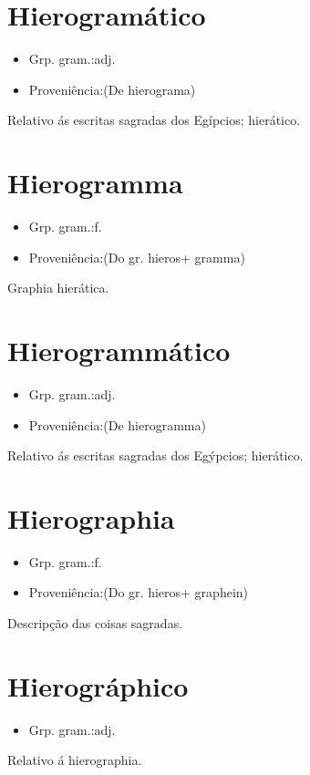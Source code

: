 \documentclass{article}
\begin{document}
\section{Hierogramático}
\begin{itemize}
\item {Grp. gram.:adj.}
\end{itemize}
\begin{itemize}
\item {Proveniência:(De \textunderscore hierograma\textunderscore )}
\end{itemize}
Relativo ás escritas sagradas dos Egípcios; hierático.
\section{Hierogramma}
\begin{itemize}
\item {Grp. gram.:f.}
\end{itemize}
\begin{itemize}
\item {Proveniência:(Do gr. \textunderscore hieros\textunderscore  + \textunderscore gramma\textunderscore )}
\end{itemize}
Graphia hierática.
\section{Hierogrammático}
\begin{itemize}
\item {Grp. gram.:adj.}
\end{itemize}
\begin{itemize}
\item {Proveniência:(De \textunderscore hierogramma\textunderscore )}
\end{itemize}
Relativo ás escritas sagradas dos Egýpcios; hierático.
\section{Hierographia}
\begin{itemize}
\item {Grp. gram.:f.}
\end{itemize}
\begin{itemize}
\item {Proveniência:(Do gr. \textunderscore hieros\textunderscore  + \textunderscore graphein\textunderscore )}
\end{itemize}
Descripção das coisas sagradas.
\section{Hierográphico}
\begin{itemize}
\item {Grp. gram.:adj.}
\end{itemize}
Relativo á hierographia.
\end{document}
